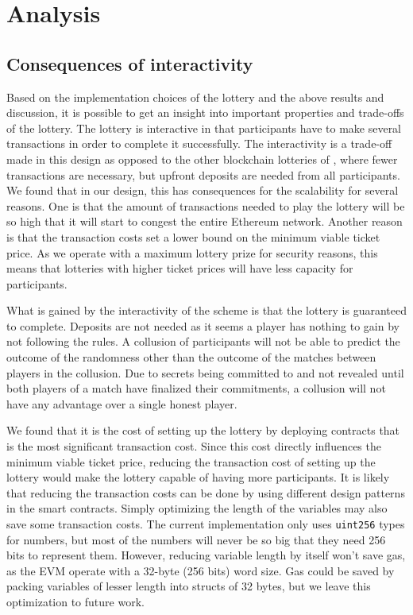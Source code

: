 \section{Analysis}
\label{sec:analysis}

\subsection{Consequences of interactivity}

Based on the implementation choices of the lottery and the above results and discussion, it is possible to get an insight into important properties and trade-offs of the lottery. The lottery is interactive in that participants have to make several transactions in order to complete it successfully. The interactivity is a trade-off made in this design as opposed to the other blockchain lotteries of \cite{andrychowicz_secure_2014,bentov_how_2014}, where fewer transactions are necessary, but upfront deposits are needed from all participants. We found that in our design, this has consequences for the scalability for several reasons. One is that the amount of transactions needed to play the lottery will be so high that it will start to congest the entire Ethereum network. Another reason is that the transaction costs set a lower bound on the minimum viable ticket price. As we operate with a maximum lottery prize for security reasons, this means that lotteries with higher ticket prices will have less capacity for participants.

What is gained by the interactivity of the scheme is that the lottery is guaranteed to complete. Deposits are not needed as it seems a player has nothing to gain by not following the rules. A collusion of participants will not be able to predict the outcome of the randomness other than the outcome of the matches between players in the collusion. Due to secrets being committed to and not revealed until both players of a match have finalized their commitments, a collusion will not have any advantage over a single honest player.

We found that it is the cost of setting up the lottery by deploying contracts that is the most significant transaction cost. Since this cost directly influences the minimum viable ticket price, reducing the transaction cost of setting up the lottery would make the lottery capable of having more participants. It is likely that reducing the transaction costs can be done by using different design patterns in the smart contracts. Simply optimizing the length of the variables may also save some transaction costs. The current implementation only uses \texttt{uint256} types for numbers, but most of the numbers will never be so big that they need 256 bits to represent them. However, reducing variable length by itself won't save gas, as the EVM operate with a 32-byte (256 bits) word size. Gas could be saved by packing variables of lesser length into structs of 32 bytes, but we leave this optimization to future work.

